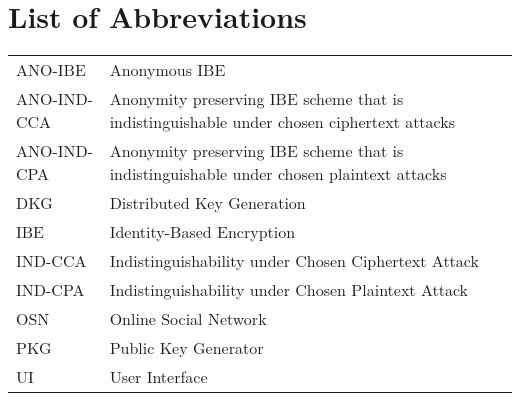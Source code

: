 \documentclass[master=eelt,masteroption=em]{kulemt}
\theoremstyle{plain}
\theoremstyle{definition}
\begin{document}
\chapter{List of Abbreviations}
\begin{flushleft}
  \renewcommand{\arraystretch}{1.1}
  \begin{tabularx}{\textwidth}{@{}p{30mm}X@{}}
    ANO-IBE & Anonymous IBE \\
    ANO-IND-CCA & Anonymity preserving IBE scheme that is indistinguishable under chosen ciphertext attacks \\ 
    ANO-IND-CPA & Anonymity preserving IBE scheme that is indistinguishable under chosen plaintext attacks \\
    DKG   & Distributed Key Generation \\
    IBE   & Identity-Based Encryption \\
    IND-CCA & Indistinguishability under Chosen Ciphertext Attack \\
    IND-CPA  & Indistinguishability under Chosen Plaintext Attack  \\
    OSN & Online Social Network \\
    PKG   & Public Key Generator \\
    UI & User Interface \\
  \end{tabularx}
\end{flushleft}
\end{document}
